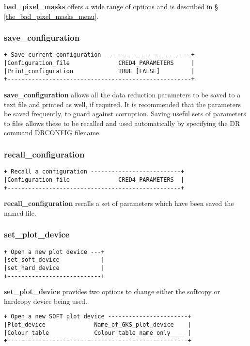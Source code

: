 {{\bf bad\_pixel\_masks} offers a wide range of options and is described in \S 
\ref{the_bad_pixel_masks_menu}.

\subsubsection{save\_configuration} 
\label{save_configuration} 
\begin{verbatim}
+ Save current configuration -------------------------+
|Configuration_file              CRED4_PARAMETERS     |
|Print_configuration             TRUE [FALSE]         |
+-----------------------------------------------------+
\end{verbatim}

{\bf save\_configuration} allows all the data reduction parameters to 
be saved to a text file and printed as well, if required.
It is recommended that the parameters be saved frequently, to 
guard against corruption.
Saving useful sets of parameters to files allows these to be recalled and 
used automatically by specifying the DR command {\sf DRCONFIG filename}.

\subsubsection{recall\_configuration} 
\label{recall_configuration} 
\begin{verbatim}
+ Recall a configuration --------------------------+
|Configuration_file              CRED4_PARAMETERS  |
+--------------------------------------------------+
\end{verbatim}

{\bf recall\_configuration} recalls a set of parameters which have been 
saved the named file.

\subsubsection{set\_plot\_device}
\label{set_plot_device}
\begin{verbatim}
+ Open a new plot device ---+
|set_soft_device            |
|set_hard_device            |
+---------------------------+
\end{verbatim}

{\bf set\_plot\_device} provides two options to change either the softcopy
or hardcopy device being used.

\begin{verbatim}
+ Open a new SOFT plot device -----------------------+
|Plot_device              Name_of_GKS_plot_device    |
|Colour_table             Colour_table_name_only____ |
+----------------------------------------------------+
\end{verbatim}

}
